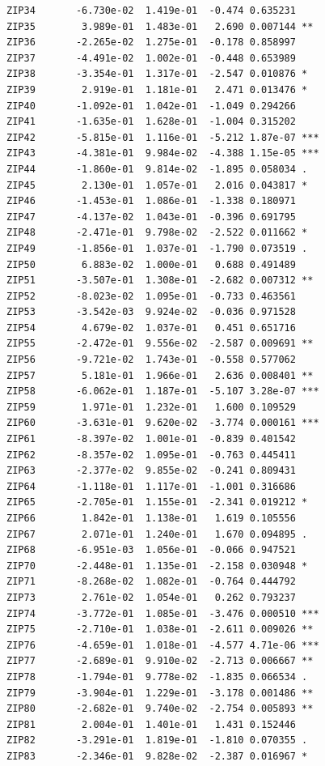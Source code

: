 \documentclass[11pt]{article}
\begin{document}
\begin{verbatim}
ZIP34       -6.730e-02  1.419e-01  -0.474 0.635231
ZIP35        3.989e-01  1.483e-01   2.690 0.007144 ** 
ZIP36       -2.265e-02  1.275e-01  -0.178 0.858997    
ZIP37       -4.491e-02  1.002e-01  -0.448 0.653989    
ZIP38       -3.354e-01  1.317e-01  -2.547 0.010876 *  
ZIP39        2.919e-01  1.181e-01   2.471 0.013476 *  
ZIP40       -1.092e-01  1.042e-01  -1.049 0.294266    
ZIP41       -1.635e-01  1.628e-01  -1.004 0.315202    
ZIP42       -5.815e-01  1.116e-01  -5.212 1.87e-07 ***
ZIP43       -4.381e-01  9.984e-02  -4.388 1.15e-05 ***
ZIP44       -1.860e-01  9.814e-02  -1.895 0.058034 .
ZIP45        2.130e-01  1.057e-01   2.016 0.043817 *  
ZIP46       -1.453e-01  1.086e-01  -1.338 0.180971    
ZIP47       -4.137e-02  1.043e-01  -0.396 0.691795    
ZIP48       -2.471e-01  9.798e-02  -2.522 0.011662 *  
ZIP49       -1.856e-01  1.037e-01  -1.790 0.073519 .
ZIP50        6.883e-02  1.000e-01   0.688 0.491489    
ZIP51       -3.507e-01  1.308e-01  -2.682 0.007312 ** 
ZIP52       -8.023e-02  1.095e-01  -0.733 0.463561    
ZIP53       -3.542e-03  9.924e-02  -0.036 0.971528    
ZIP54        4.679e-02  1.037e-01   0.451 0.651716    
ZIP55       -2.472e-01  9.556e-02  -2.587 0.009691 ** 
ZIP56       -9.721e-02  1.743e-01  -0.558 0.577062    
ZIP57        5.181e-01  1.966e-01   2.636 0.008401 ** 
ZIP58       -6.062e-01  1.187e-01  -5.107 3.28e-07 ***
ZIP59        1.971e-01  1.232e-01   1.600 0.109529    
ZIP60       -3.631e-01  9.620e-02  -3.774 0.000161 ***
ZIP61       -8.397e-02  1.001e-01  -0.839 0.401542
ZIP62       -8.357e-02  1.095e-01  -0.763 0.445411    
ZIP63       -2.377e-02  9.855e-02  -0.241 0.809431
ZIP64       -1.118e-01  1.117e-01  -1.001 0.316686    
ZIP65       -2.705e-01  1.155e-01  -2.341 0.019212 *  
ZIP66        1.842e-01  1.138e-01   1.619 0.105556    
ZIP67        2.071e-01  1.240e-01   1.670 0.094895 .  
ZIP68       -6.951e-03  1.056e-01  -0.066 0.947521    
ZIP70       -2.448e-01  1.135e-01  -2.158 0.030948 *  
ZIP71       -8.268e-02  1.082e-01  -0.764 0.444792    
ZIP73        2.761e-02  1.054e-01   0.262 0.793237    
ZIP74       -3.772e-01  1.085e-01  -3.476 0.000510 ***
ZIP75       -2.710e-01  1.038e-01  -2.611 0.009026 **
ZIP76       -4.659e-01  1.018e-01  -4.577 4.71e-06 ***
ZIP77       -2.689e-01  9.910e-02  -2.713 0.006667 ** 
ZIP78       -1.794e-01  9.778e-02  -1.835 0.066534 .  
ZIP79       -3.904e-01  1.229e-01  -3.178 0.001486 ** 
ZIP80       -2.682e-01  9.740e-02  -2.754 0.005893 ** 
ZIP81        2.004e-01  1.401e-01   1.431 0.152446    
ZIP82       -3.291e-01  1.819e-01  -1.810 0.070355 .  
ZIP83       -2.346e-01  9.828e-02  -2.387 0.016967 *  

\end{verbatim}
\end{document}
